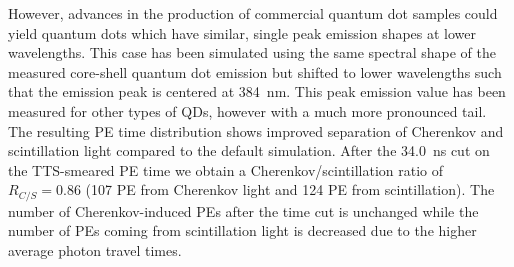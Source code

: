 \documentclass[cits]{JINST}
\begin{document}
However, advances in the production of commercial quantum dot samples
could yield quantum dots which have similar, single peak emission
shapes at lower wavelengths. This case has been simulated using the
same spectral shape of the measured core-shell quantum dot emission
but shifted to lower wavelengths such that the emission peak is
centered at 384~nm. This peak emission value has been measured for
other types of QDs, however with a much more pronounced 
tail\cite{qdot2}. The resulting PE time distribution shows improved
separation of Cherenkov and scintillation light compared to the
default simulation. After the 34.0~ns cut on the TTS-smeared PE time
we obtain a Cherenkov/scintillation ratio of $R_{C/S}=0.86$ (107 PE
from Cherenkov light and 124 PE from scintillation). The number of
Cherenkov-induced PEs after the time cut is unchanged while the number
of PEs coming from scintillation light is decreased due to the higher
average photon travel times.
\end{document}

